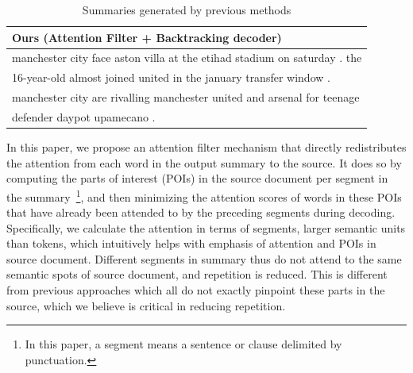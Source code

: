 \begin{table}[th]
\begin{center}
\begin{tabular}{|l|}
\hline \bf Ours (Attention Filter + Backtracking decoder) \\
\hline manchester city face aston villa at the etihad stadium on saturday . the \\
       16-year-old almost joined united in the january transfer window . \\
	   manchester city are rivalling manchester united and arsenal for teenage \\
	   defender daypot upamecano .\\
\hline
\end{tabular}
\end{center}
\caption{\label{tab:strong_methods} Summaries generated by previous methods}
\end{table}

In this paper, we propose an attention filter mechanism that directly 
redistributes the attention from each word in the output summary to the source. 
It does so by computing the parts of interest (POIs) in the source document
per segment in the summary~\footnote{In this paper, a segment means 
a sentence or clause delimited by punctuation.}, and then minimizing the attention scores of
words in these POIs that have already been attended to by the preceding 
segments during decoding. 
Specifically, we calculate the attention in terms of segments, larger semantic units than tokens, which intuitively helps with emphasis of attention and  POIs in source document.
Different segments in summary thus do not attend to the same semantic spots
of source document, and repetition is reduced. 
This is different from previous approaches
which all 
do not exactly pinpoint these parts in the source,
which we believe is critical in reducing repetition. 

